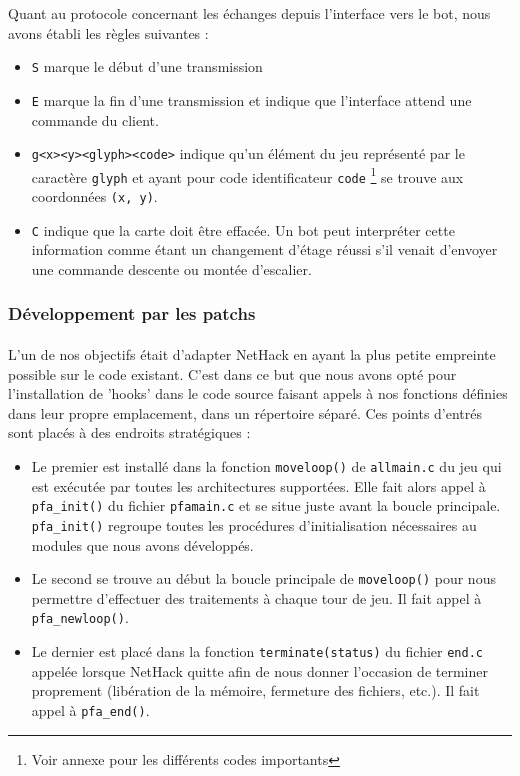 \documentclass[a4paper,12pt]{article}
\begin{document}
Quant au protocole concernant les échanges depuis l'interface vers le bot,
nous avons établi les règles suivantes :
\begin{itemize}
	\item \verb!S! marque le début d'une transmission
	\item \verb!E! marque la fin d'une transmission et indique que l'interface
		attend une commande du client.
	\item \verb!g<x><y><glyph><code>! indique qu'un élément du jeu représenté
		par le caractère \verb!glyph! et ayant pour code identificateur
		\verb!code! \footnote{Voir annexe pour les différents codes
		importants} se trouve aux coordonnées \verb!(x, y)!.
	\item \verb!C! indique que la carte doit être effacée. Un bot peut
		interpréter cette information comme étant un changement d'étage réussi
		s'il venait d'envoyer une commande descente ou montée d'escalier.
\end{itemize}


\subsubsection*{Développement par les patchs}

\paragraph{} L'un de nos objectifs était d'adapter NetHack en ayant la plus
petite empreinte possible sur le code existant. C'est dans ce but que nous
avons opté pour l'installation de 'hooks' dans le code source faisant appels à
nos fonctions définies dans leur propre emplacement, dans un répertoire
séparé. Ces points d'entrés sont placés à des endroits stratégiques :
\begin{itemize}
	\item Le premier est installé dans la fonction \verb!moveloop()! de
		\verb!allmain.c! du jeu qui est exécutée par toutes les architectures
		supportées. Elle fait alors appel à \verb!pfa_init()! du fichier
		\verb!pfamain.c! et se situe juste avant la boucle principale.
		\verb!pfa_init()! regroupe toutes les procédures d'initialisation
		nécessaires au modules que nous avons développés.
	\item Le second se trouve au début la boucle principale de
		\verb!moveloop()! pour nous permettre d'effectuer des traitements à
		chaque tour de jeu. Il fait appel à \verb!pfa_newloop()!.
	\item Le dernier est placé dans la fonction \verb!terminate(status)! du
		fichier \verb!end.c! appelée lorsque NetHack quitte afin de nous
		donner l'occasion de terminer proprement (libération de la mémoire,
		fermeture des fichiers, etc.). Il fait appel à \verb!pfa_end()!.
\end{itemize}
\end{document}
